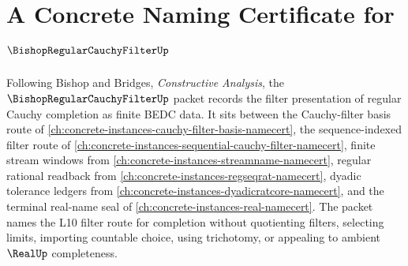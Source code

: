 \chapter{A Concrete Naming Certificate for $\BishopRegularCauchyFilterUp$}
\label{ch:concrete-instances-bishop-regular-cauchy-filter-namecert}

Following Bishop and Bridges, \emph{Constructive Analysis}, the $\BishopRegularCauchyFilterUp$ packet records the filter presentation of regular Cauchy completion as finite BEDC data. It sits between the Cauchy-filter basis route of \autoref{ch:concrete-instances-cauchy-filter-basis-namecert}, the sequence-indexed filter route of \autoref{ch:concrete-instances-sequential-cauchy-filter-namecert}, finite stream windows from \autoref{ch:concrete-instances-streamname-namecert}, regular rational readback from \autoref{ch:concrete-instances-regseqrat-namecert}, dyadic tolerance ledgers from \autoref{ch:concrete-instances-dyadicratcore-namecert}, and the terminal real-name seal of \autoref{ch:concrete-instances-real-namecert}. The packet names the L10 filter route for completion without quotienting filters, selecting limits, importing countable choice, using trichotomy, or appealing to ambient $\RealUp$ completeness.


